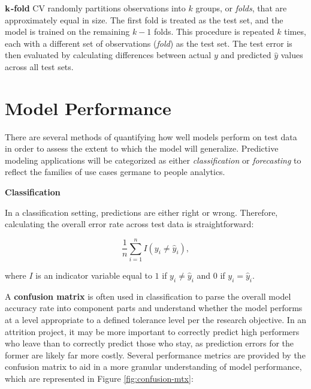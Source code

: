\documentclass[
]{book}
\begin{document}
\(\textbf k\)\textbf{-fold} CV randomly partitions observations into \(k\) groups, or \emph{folds}, that are approximately equal in size. The first fold is treated as the test set, and the model is trained on the remaining \(k-1\) folds. This procedure is repeated \(k\) times, each with a different set of observations (\emph{fold}) as the test set. The test error is then evaluated by calculating differences between actual \(y\) and predicted \(\hat y\) values across all test sets.

\hypertarget{model-performance}{%
\section{Model Performance}\label{model-performance}}

There are several methods of quantifying how well models perform on test data in order to assess the extent to which the model will generalize. Predictive modeling applications will be categorized as either \emph{classification} or \emph{forecasting} to reflect the families of use cases germane to people analytics.

\textbf{Classification}

In a classification setting, predictions are either right or wrong. Therefore, calculating the overall error rate across test data is straightforward:

\[ \frac{1}{n} \displaystyle\sum_{i=1}^{n} I(y_i \ne \hat y_i), \]

where \(I\) is an indicator variable equal to \(1\) if \(y_i \ne \hat y_i\) and \(0\) if \(y_i = \hat y_i\).

A \textbf{confusion matrix} is often used in classification to parse the overall model accuracy rate into component parts and understand whether the model performs at a level appropriate to a defined tolerance level per the research objective. In an attrition project, it may be more important to correctly predict high performers who leave than to correctly predict those who stay, as prediction errors for the former are likely far more costly. Several performance metrics are provided by the confusion matrix to aid in a more granular understanding of model performance, which are represented in Figure \ref{fig:confusion-mtx}:
\end{document}
